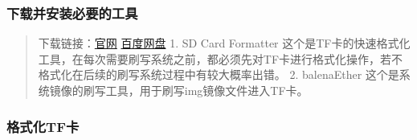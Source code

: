 \subsubsection{下载并安装必要的工具}\label{ux4e0bux8f7dux5e76ux5b89ux88c5ux5fc5ux8981ux7684ux5de5ux5177}

\begin{quote}
下载链接：\href{http://www.orangepi.cn/html/hardWare/computerAndMicrocontrollers/service-and-support/Orange-Pi-AIpro.html}{官网}
\href{https://pan.baidu.com/s/1Jho73pw91r5GJD2KijY45Q?pwd=3xuz\#list/path=\%2F}{百度网盘}
1. SD Card Formatter
这个是TF卡的快速格式化工具，在每次需要刷写系统之前，都必须先对TF卡进行格式化操作，若不格式化在后续的刷写系统过程中有较大概率出错。
2. balenaEther 这个是系统镜像的刷写工具，用于刷写img镜像文件进入TF卡。
\end{quote}

\subsubsection{格式化TF卡}\label{ux683cux5f0fux5316tfux5361}

